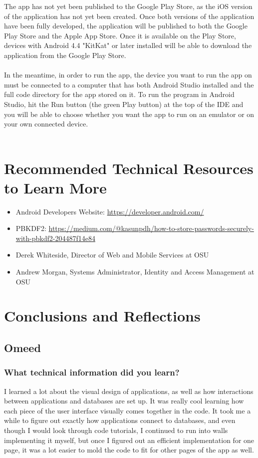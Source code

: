 \documentclass[onecolumn, draftclsnofoot,10pt, compsoc]{IEEEtran}
\begin{document}
  The app has not yet been published to the Google Play Store, as the iOS version of the application has not yet been created. Once both versions of the application have been fully developed, the application will be published to both the Google Play Store and the Apple App Store. Once it is available on the Play Store, devices with Android 4.4 "KitKat" or later installed will be able to download the application from the Google Play Store. \\ \\
  In the meantime, in order to run the app, the device you want to run the app on must be connected to a computer that has both Android Studio installed and the full code directory for the app stored on it. To run the program in Android Studio, hit the Run button (the green Play button) at the top of the IDE and you will be able to choose whether you want the app to run on an emulator or on your own connected device. \\ \\

\section{Recommended Technical Resources to Learn More}
  \begin{itemize}
    \item Android Developers Website: \url{https://developer.android.com/}
    \item PBKDF2: \url{https://medium.com/@kasunpdh/how-to-store-passwords-securely-with-pbkdf2-204487f14e84}
    \item Derek Whiteside, Director of Web and Mobile Services at OSU
    \item Andrew Morgan, Systems Administrator, Identity and Access Management at OSU
  \end{itemize}
  \newpage

\section{Conclusions and Reflections}
  \subsection{Omeed}
    \subsubsection{What technical information did you learn?}
      I learned a lot about the visual design of applications, as well as how interactions between applications and databases are set up. It was really cool learning how each piece of the user interface visually comes together in the code. It took me a while to figure out exactly how applications connect to databases, and even though I would look through code tutorials, I continued to run into walls implementing it myself, but once I figured out an efficient implementation for one page, it was a lot easier to mold the code to fit for other pages of the app as well.
\end{document}
